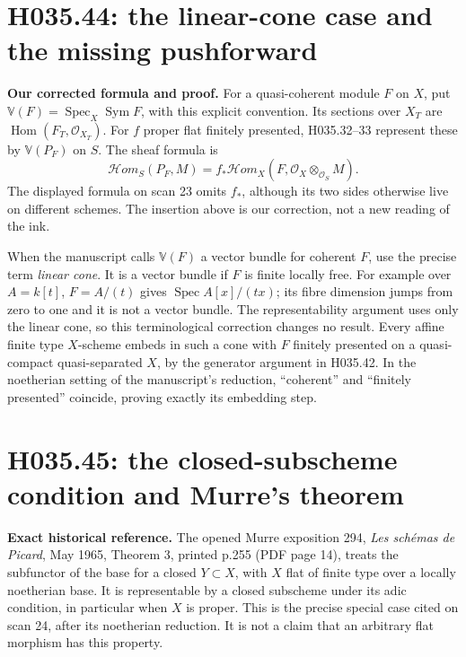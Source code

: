 \section{H035.44: the linear-cone case and the missing pushforward}
\textbf{Our corrected formula and proof.} For a quasi-coherent
module $F$ on $X$, put $\mathbb V(F)=\operatorname{Spec}_X
\operatorname{Sym}F$, with this explicit convention. Its sections
over $X_T$ are $\operatorname{Hom}(F_T,\mathcal O_{X_T})$.
For $f$ proper flat finitely presented, H035.32--33 represent
these by $\mathbb V(P_F)$ on $S$. The sheaf formula is
\[
 \mathcal Hom_S(P_F,M)=
 f_*\mathcal Hom_X(F,\mathcal O_X\otimes_{\mathcal O_S}M).
\]
The displayed formula on scan 23 omits $f_*$, although its two
sides otherwise live on different schemes. The insertion above
is our correction, not a new reading of the ink.

When the manuscript calls $\mathbb V(F)$ a vector bundle for
coherent $F$, use the precise term \emph{linear cone}. It is a
vector bundle if $F$ is finite locally free. For example over
$A=k[t]$, $F=A/(t)$ gives $\operatorname{Spec}A[x]/(tx)$;
its fibre dimension jumps from zero to one and it is not a
vector bundle. The representability argument uses only the
linear cone, so this terminological correction changes no result.
Every affine finite type $X$-scheme embeds in such a cone with
$F$ finitely presented on a quasi-compact quasi-separated $X$,
by the generator argument in H035.42. In the noetherian setting
of the manuscript's reduction, ``coherent'' and ``finitely
presented'' coincide, proving exactly its embedding step.

\section{H035.45: the closed-subscheme condition and Murre's theorem}
\textbf{Exact historical reference.} The opened Murre exposition
294, \emph{Les schémas de Picard}, May 1965, Theorem 3, printed
p.255 (PDF page 14), treats the subfunctor of the base for a
closed $Y\subset X$, with $X$ flat of finite type over a locally
noetherian base. It is representable by a closed subscheme under
its adic condition, in particular when $X$ is proper. This is
the precise special case cited on scan 24, after its noetherian
reduction. It is not a claim that an arbitrary flat morphism has
this property.

